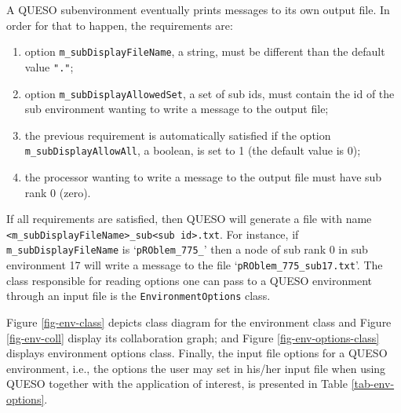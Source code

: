 A QUESO subenvironment eventually prints messages to its own output file. In order for that to happen, the requirements are:
\begin{enumerate}
 \item option \verb+m_subDisplayFileName+, a string, must be different than the default value \verb+"."+;
\item  option \verb+m_subDisplayAllowedSet+, a set of sub ids, must contain the id of the sub environment wanting to write a message to the output file;
\item  the previous requirement is automatically satisfied if the option \verb+m_subDisplayAllowAll+, a boolean, is set to 1 (the default value is 0);
\item  the processor wanting to write a message to the output file must have sub rank 0 (zero).
\end{enumerate}

If all requirements are satisfied, then QUESO will generate a file with name \linebreak 
\verb+<m_subDisplayFileName>_sub<sub id>.txt+.   For instance, if \verb+m_subDisplayFileName+ is `\verb+pROblem_775_+' then a node of sub rank 0 in sub environment 17 will write a message to the file `\verb+pROblem_775_sub17.txt+'. The class responsible for reading options one can pass to a QUESO environment through an input file is the \verb+EnvironmentOptions+ class.

Figure \ref{fig-env-class} depicts class diagram for the environment class and Figure \ref{fig-env-coll} display its collaboration graph; and Figure  \ref{fig-env-options-class} displays environment options class. %
 Finally, the input file options for a QUESO environment, i.e., the options the user may set in his/her input file when using QUESO together with the application of interest, is presented in Table \ref{tab-env-options}.

